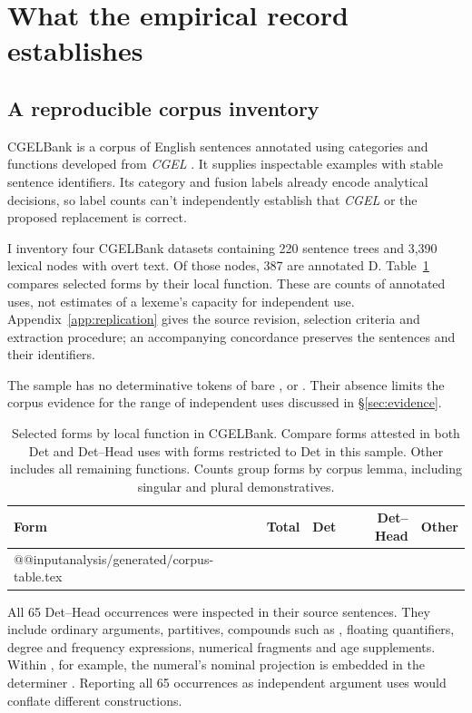 \documentclass[12pt]{article}
\makeatletter
\newcommand{\tablebody}[1]{\csname @@input\endcsname #1 }
\makeatother
\begin{document}
\section{What the empirical record establishes}\label{sec:empirical}

\subsection{A reproducible corpus inventory}

CGELBank is a corpus of English sentences annotated using categories and functions developed from \textit{CGEL} \citep{reynolds2023unified}. It supplies inspectable examples with stable sentence identifiers. Its category and fusion labels already encode analytical decisions, so label counts can't independently establish that \textit{CGEL} or the proposed replacement is correct.

I inventory four CGELBank datasets containing 220 sentence trees and 3,390 lexical nodes with overt text. Of those nodes, 387 are annotated D. Table~\ref{tab:corpus} compares selected forms by their local function. These are counts of annotated uses, not estimates of a lexeme's capacity for independent use. Appendix~\ref{app:replication} gives the source revision, selection criteria and extraction procedure; an accompanying concordance preserves the sentences and their identifiers.

The sample has no determinative tokens of bare ,  or . Their absence limits the corpus evidence for the range of independent uses discussed in §\ref{sec:evidence}.

\begin{table}[tb]
\centering\small
\caption{Selected forms by local function in CGELBank. Compare forms attested in both Det and Det--Head uses with forms restricted to Det in this sample. Other includes all remaining functions. Counts group forms by corpus lemma, including singular and plural demonstratives.}\label{tab:corpus}
\begin{tabular}{lrrrr}
\toprule
Form & Total & Det & Det--Head & Other \\
\midrule
\tablebody{analysis/generated/corpus-table.tex}
\bottomrule
\end{tabular}
\end{table}

All 65 Det--Head occurrences were inspected in their source sentences. They include ordinary arguments, partitives, compounds such as , floating quantifiers, degree and frequency expressions, numerical fragments and age supplements. Within , for example, the numeral's nominal projection is embedded in the determiner . Reporting all 65 occurrences as independent argument uses would conflate different constructions.
\end{document}
